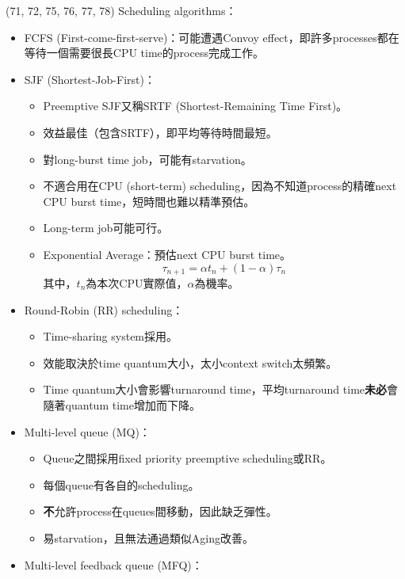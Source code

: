 \begin{theorem}{(71, 72, 75, 76, 77, 78)} Scheduling algorithms： \begin{itemize}
        \item FCFS (First-come-first-serve)：可能遭遇Convoy effect，即許多processes都在等待一個需要很長CPU time的process完成工作。
        \item SJF (Shortest-Job-First)：\begin{itemize}
            \item Preemptive SJF又稱SRTF (Shortest-Remaining Time First)。
            \item 效益最佳（包含SRTF），即平均等待時間最短。
            \item 對long-burst time job，可能有starvation。
            \item 不適合用在CPU (short-term) scheduling，因為不知道process的精確next CPU burst time，短時間也難以精準預估。
            \item Long-term job可能可行。
            \item Exponential Average：預估next CPU burst time。\begin{equation}
                \tau_{n + 1} = \alpha t_n + (1 - \alpha)\tau_n
            \end{equation} 其中，$t_n$為本次CPU實際值，$\alpha$為機率。
        \end{itemize}
        \item Round-Robin (RR) scheduling：\begin{itemize}
            \item Time-sharing system採用。
            \item 效能取決於time quantum大小，太小context switch太頻繁。
            \item Time quantum大小會影響turnaround time，平均turnaround time\textbf{未必}會隨著quantum time增加而下降。
        \end{itemize}
        \item Multi-level queue (MQ)：\begin{itemize}
            \item Queue之間採用fixed priority preemptive scheduling或RR。
            \item 每個queue有各自的scheduling。
            \item \textbf{不}允許process在queues間移動，因此缺乏彈性。
            \item 易starvation，且無法通過類似Aging改善。
        \end{itemize}
        \item Multi-level feedback queue (MFQ)：\begin{itemize}

\end{itemize}
\end{itemize}
\end{theorem}
